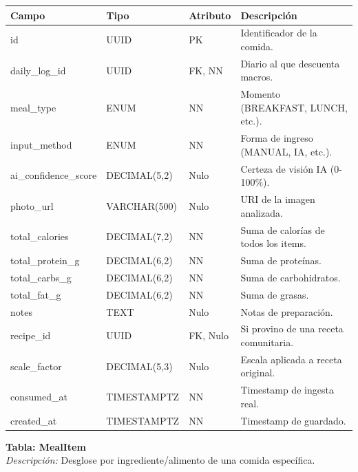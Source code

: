 \documentclass[12pt]{article}
\begin{document}
\begin{table}[h!]
    \centering
    \renewcommand{\arraystretch}{1.2}
    \small
    \begin{tabular}{|p{3.5cm}|p{2.7cm}|p{2cm}|p{6.5cm}|}
        \hline
        \rowcolor[HTML]{EFEFEF}
        \textbf{Campo} & \textbf{Tipo} & \textbf{Atributo} & \textbf{Descripción} \\ \hline
        id & UUID & PK & Identificador de la comida. \\ \hline
        daily\_log\_id & UUID & FK, NN & Diario al que descuenta macros. \\ \hline
        meal\_type & ENUM & NN & Momento (BREAKFAST, LUNCH, etc.). \\ \hline
        input\_method & ENUM & NN & Forma de ingreso (MANUAL, IA, etc.). \\ \hline
        ai\_confidence\_score & DECIMAL(5,2) & Nulo & Certeza de visión IA (0-100\%). \\ \hline
        photo\_url & VARCHAR(500) & Nulo & URI de la imagen analizada. \\ \hline
        total\_calories & DECIMAL(7,2) & NN & Suma de calorías de todos los items. \\ \hline
        total\_protein\_g & DECIMAL(6,2) & NN & Suma de proteínas. \\ \hline
        total\_carbs\_g & DECIMAL(6,2) & NN & Suma de carbohidratos. \\ \hline
        total\_fat\_g & DECIMAL(6,2) & NN & Suma de grasas. \\ \hline
        notes & TEXT & Nulo & Notas de preparación. \\ \hline
        recipe\_id & UUID & FK, Nulo & Si provino de una receta comunitaria. \\ \hline
        scale\_factor & DECIMAL(5,3) & Nulo & Escala aplicada a receta original. \\ \hline
        consumed\_at & TIMESTAMPTZ & NN & Timestamp de ingesta real. \\ \hline
        created\_at & TIMESTAMPTZ & NN & Timestamp de guardado. \\ \hline
    \end{tabular}
\end{table}
\newpage
\noindent\textbf{Tabla: MealItem} \\
\textit{Descripción:} Desglose por ingrediente/alimento de una comida específica.
\end{document}
